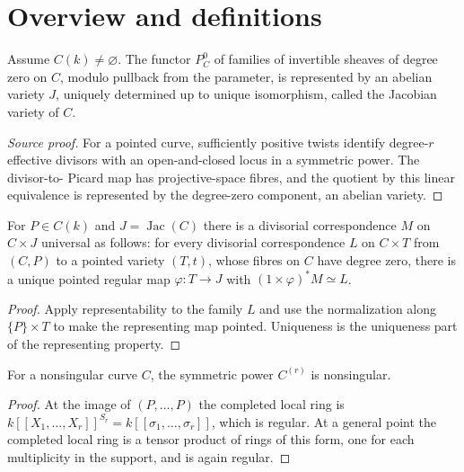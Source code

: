 
\section{Overview and definitions}
\begin{theorem}\label{thm:milne-jacobian-representability-pointed}
Assume $C(k)\ne\varnothing$. The functor $P_C^0$ of families of invertible sheaves of degree zero on $C$, modulo pullback from the parameter, is represented by an abelian variety $J$, uniquely determined up to unique isomorphism, called the Jacobian variety of $C$.
\end{theorem}
\begin{proof}[Source proof]
For a pointed curve, sufficiently positive twists identify degree-$r$ effective
divisors with an open-and-closed locus in a symmetric power.  The divisor-to-
Picard map has projective-space fibres, and the quotient by this linear
equivalence is represented by the degree-zero component, an abelian variety.
\end{proof}
\begin{proposition}\label{prop:milne-jacobian-universal-correspondence}
For $P\in C(k)$ and $J=\operatorname{Jac}(C)$ there is a divisorial correspondence $M$ on $C\times J$ universal as follows: for every divisorial correspondence $L$ on $C\times T$ from $(C,P)$ to a pointed variety $(T,t)$, whose fibres on $C$ have degree zero, there is a unique pointed regular map $\varphi:T\to J$ with $(1\times\varphi)^*M\simeq L$.
\end{proposition}
\begin{proof}
Apply representability to the family $L$ and use the normalization along
$\{P\}\times T$ to make the representing map pointed.  Uniqueness is the
uniqueness part of the representing property.
\end{proof}
\begin{lemma}\label{lem:milne-symmetric-power-smooth}
For a nonsingular curve $C$, the symmetric power $C^{(r)}$ is nonsingular.
\end{lemma}

\begin{proof}

At the image of $(P,\ldots,P)$ the completed local ring is $k[[X_1,\ldots,X_r]]^{S_r}=k[[\sigma_1,\ldots,\sigma_r]]$, which is regular. At a general point the completed local ring is a tensor product of rings of this form, one for each multiplicity in the support, and is again regular.

\end{proof}

